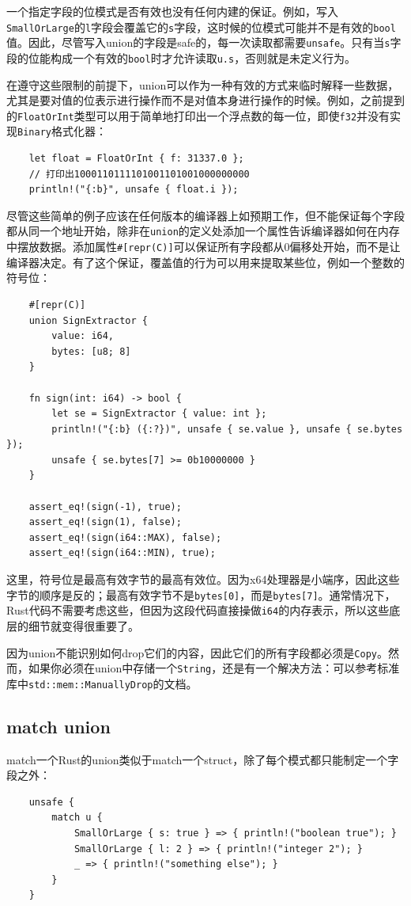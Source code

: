 一个指定字段的位模式是否有效也没有任何内建的保证。例如，写入\texttt{SmallOrLarge}的\texttt{l}字段会覆盖它的\texttt{s}字段，这时候的位模式可能并不是有效的\texttt{bool}值。因此，尽管写入union的字段是safe的，每一次读取都需要\texttt{unsafe}。只有当\texttt{s}字段的位能构成一个有效的\texttt{bool}时才允许读取\texttt{u.s}，否则就是未定义行为。

在遵守这些限制的前提下，union可以作为一种有效的方式来临时解释一些数据，尤其是要对值的位表示进行操作而不是对值本身进行操作的时候。例如，之前提到的\texttt{FloatOrInt}类型可以用于简单地打印出一个浮点数的每一位，即使\texttt{f32}并没有实现\texttt{Binary}格式化器：
\begin{verbatim}
    let float = FloatOrInt { f: 31337.0 };
    // 打印出1000110111101001101001000000000
    println!("{:b}", unsafe { float.i });
\end{verbatim}

尽管这些简单的例子应该在任何版本的编译器上如预期工作，但不能保证每个字段都从同一个地址开始，除非在\texttt{union}的定义处添加一个属性告诉编译器如何在内存中摆放数据。添加属性\texttt{\#[repr(C)]}可以保证所有字段都从0偏移处开始，而不是让编译器决定。有了这个保证，覆盖值的行为可以用来提取某些位，例如一个整数的符号位：
\begin{verbatim}
    #[repr(C)]
    union SignExtractor {
        value: i64,
        bytes: [u8; 8]
    }

    fn sign(int: i64) -> bool {
        let se = SignExtractor { value: int };
        println!("{:b} ({:?})", unsafe { se.value }, unsafe { se.bytes });
        unsafe { se.bytes[7] >= 0b10000000 }
    }

    assert_eq!(sign(-1), true);
    assert_eq!(sign(1), false);
    assert_eq!(sign(i64::MAX), false);
    assert_eq!(sign(i64::MIN), true);
\end{verbatim}

这里，符号位是最高有效字节的最高有效位。因为x64处理器是小端序，因此这些字节的顺序是反的；最高有效字节不是\texttt{bytes[0]}，而是\texttt{bytes[7]}。通常情况下，Rust代码不需要考虑这些，但因为这段代码直接操做\texttt{i64}的内存表示，所以这些底层的细节就变得很重要了。

因为union不能识别如何drop它们的内容，因此它们的所有字段都必须是\texttt{Copy}。然而，如果你必须在union中存储一个\texttt{String}，还是有一个解决方法：可以参考标准库中\texttt{std::mem::ManuallyDrop}的文档。

\subsection{match union}
match一个Rust的union类似于match一个struct，除了每个模式都只能制定一个字段之外：
\begin{verbatim}
    unsafe {
        match u {
            SmallOrLarge { s: true } => { println!("boolean true"); }
            SmallOrLarge { l: 2 } => { println!("integer 2"); }
            _ => { println!("something else"); }
        }
    }
\end{verbatim}

